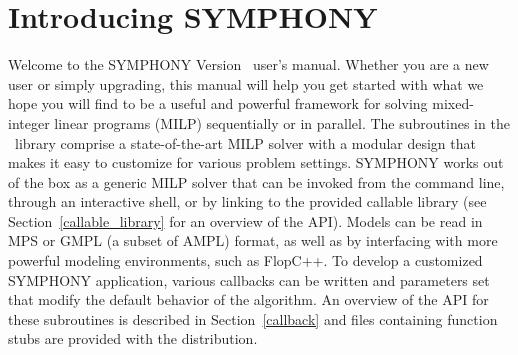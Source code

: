 
\section{Introducing SYMPHONY \VER}
\label{whats-new}

Welcome to the SYMPHONY Version \VER\  user's manual. Whether you are a new user
or simply upgrading, this manual will help you get started with what we hope
you will find to be a useful and powerful framework for solving mixed-integer
linear programs (MILP) sequentially or in parallel. The subroutines in the
\BB\ library comprise a state-of-the-art MILP solver with a modular design
that makes it easy to customize for various problem settings. SYMPHONY works
out of the box as a generic MILP solver that can be invoked from the command
line, through an interactive shell, or by linking to the provided callable
library (see Section~\ref{callable_library} for an overview of the API).
Models can be read in MPS or GMPL (a subset of AMPL) format, as well as by
interfacing with more powerful modeling environments, such as FlopC++. To
develop a customized SYMPHONY application, various callbacks can be written
and parameters set that modify the default behavior of the algorithm. An
overview of the API for these subroutines is described in
Section~\ref{callback} and files containing function stubs are provided with
the distribution.

